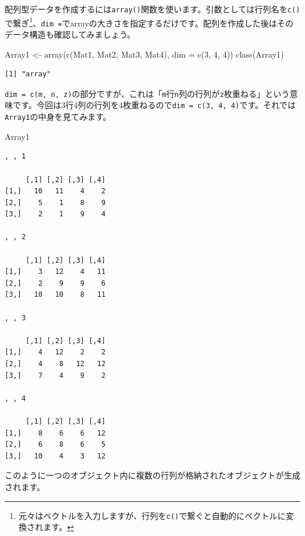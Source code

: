 \documentclass[
  a4paper,
  pandoc,
  ja=standard,
  jafont=haranoaji]{bxjsbook}
\newenvironment{Shaded}{\begin{snugshade}}{\end{snugshade}}
\newcommand{\AttributeTok}[1]{\textcolor[rgb]{0.00,0.48,0.65}{#1}}
\newcommand{\DecValTok}[1]{\textcolor[rgb]{0.68,0.00,0.00}{#1}}
\newcommand{\FunctionTok}[1]{\textcolor[rgb]{0.28,0.35,0.67}{#1}}
\newcommand{\NormalTok}[1]{\textcolor[rgb]{0.00,0.48,0.65}{#1}}
\newcommand{\OtherTok}[1]{\textcolor[rgb]{0.00,0.48,0.65}{#1}}
\begin{document}
配列型データを作成するには\texttt{array()}関数を使います。引数としては行列名を\texttt{c()}で繋ぎ\footnote{元々はベクトルを入力しますが、行列を\texttt{c()}で繋ぐと自動的にベクトルに変換されます。}、\texttt{dim\ =}でarrayの大きさを指定するだけです。配列を作成した後はそのデータ構造も確認してみましょう。

\begin{Shaded}
\begin{Highlighting}[numbers=left,,]
\NormalTok{Array1 }\OtherTok{\textless{}{-}} \FunctionTok{array}\NormalTok{(}\FunctionTok{c}\NormalTok{(Mat1, Mat2, Mat3, Mat4), }\AttributeTok{dim =} \FunctionTok{c}\NormalTok{(}\DecValTok{3}\NormalTok{, }\DecValTok{4}\NormalTok{, }\DecValTok{4}\NormalTok{))}
\FunctionTok{class}\NormalTok{(Array1)}
\end{Highlighting}
\end{Shaded}

\begin{verbatim}
[1] "array"
\end{verbatim}

\texttt{dim\ =\ c(m,\ n,\ z)}の部分ですが、これは「\texttt{m}行\texttt{n}列の行列が\texttt{z}枚重ねる」という意味です。今回は3行4列の行列を4枚重ねるので\texttt{dim\ =\ c(3,\ 4,\ 4)}です。それでは\texttt{Array1}の中身を見てみます。

\begin{Shaded}
\begin{Highlighting}[numbers=left,,]
\NormalTok{Array1}
\end{Highlighting}
\end{Shaded}

\begin{verbatim}
, , 1

     [,1] [,2] [,3] [,4]
[1,]   10   11    4    2
[2,]    5    1    8    9
[3,]    2    1    9    4

, , 2

     [,1] [,2] [,3] [,4]
[1,]    3   12    4   11
[2,]    2    9    9    6
[3,]   10   10    8   11

, , 3

     [,1] [,2] [,3] [,4]
[1,]    4   12    2    2
[2,]    4    8   12   12
[3,]    7    4    9    2

, , 4

     [,1] [,2] [,3] [,4]
[1,]    8    6    6   12
[2,]    6    8    6    5
[3,]   10    4    3   12
\end{verbatim}

このように一つのオブジェクト内に複数の行列が格納されたオブジェクトが生成されます。
\end{document}
